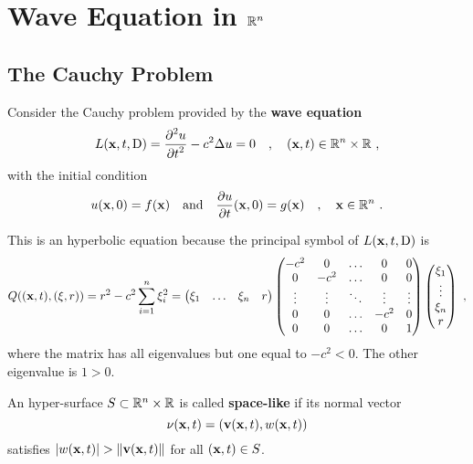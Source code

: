 \chapter{Wave Equation in $\mathbb{R}^n$} \label{ChapWaveEqunD}

\section{The Cauchy Problem}

Consider the Cauchy problem provided by the
{\bfseries wave equation} 
\begin{equation} \label{wave_nD}
L(\mathbf{x},t,\operatorname{D}) = \frac{\displaystyle \partial^{2}{u}} {\displaystyle \partial t^{2}} - c^2 \Delta u = 0 \quad ,
\quad (\mathbf{x},t) \in \mathbb{R}^n \times \mathbb{R} \ ,
\end{equation}
with the initial condition
\begin{equation} \label{wave_nD_cond}
u(\mathbf{x}, 0) = f(\mathbf{x}) \quad \text{and} \quad
\frac{\partial{u}}{\partial t}(\mathbf{x},0) = g(\mathbf{x}) \quad , \quad
\mathbf{x} \in \mathbb{R}^n \ .
\end{equation}

This is an hyperbolic equation because the principal symbol of
$L(\mathbf{x},t,\operatorname{D})$ is
\[
Q((\mathbf{x},t), (\mathbf{\xi},r)) = r^2 - c^2 \sum_{i=1}^n \xi_i^2 =
\begin{pmatrix}
\xi_1 & \ldots & \xi_n & r
\end{pmatrix}
\begin{pmatrix}
-c^2 & 0 & \ldots & 0 & 0 \\
0 & -c^2 & \ldots & 0 & 0 \\
\vdots & \vdots & \ddots & \vdots & \vdots \\
0 & 0 & \ldots & -c^2 & 0 \\
0 & 0 & \ldots & 0 & 1 \\
\end{pmatrix}
\begin{pmatrix}
\xi_1 \\ \vdots \\ \xi_n \\ r
\end{pmatrix}
\ ,
\]
where the matrix has all eigenvalues but one equal to $-c^2 <0$.  The
other eigenvalue is $1>0$.
\begin{defn}
An hyper-surface $S \subset \mathbb{R}^n \times \mathbb{R}$ is called
{\bfseries space-like} if its normal vector
\[
\mathbf{\nu}(\mathbf{x},t) = (\mathbf{v}(\mathbf{x},t) , w(\mathbf{x},t) )
\]
satisfies $|w(\mathbf{x},t)| > \| \mathbf{v}(\mathbf{x},t) \|$ for all
$(\mathbf{x},t) \in S$.
\end{defn}

